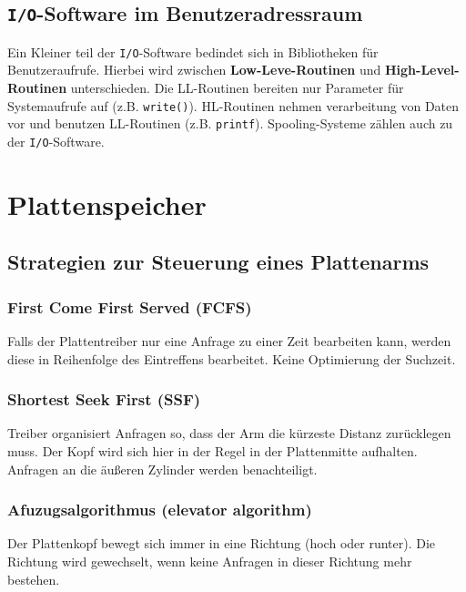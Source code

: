 \subsection{\texttt{I/O}-Software im Benutzeradressraum}

Ein Kleiner teil der \texttt{I/O}-Software bedindet sich in Bibliotheken für
Benutzeraufrufe. Hierbei wird zwischen \textbf{Low-Leve-Routinen} und
\textbf{High-Level-Routinen} unterschieden. Die LL-Routinen bereiten nur
Parameter für Systemaufrufe auf (z.B. \texttt{write()}). HL-Routinen nehmen
verarbeitung von Daten vor und benutzen LL-Routinen (z.B. \texttt{printf}).
Spooling-Systeme zählen auch zu der \texttt{I/O}-Software.

\section{Plattenspeicher}

\subsection{Strategien zur Steuerung eines Plattenarms}

\subsubsection{First Come First Served (FCFS)}

Falls der Plattentreiber nur eine Anfrage zu einer Zeit bearbeiten kann, werden
diese in Reihenfolge des Eintreffens bearbeitet. Keine Optimierung der
Suchzeit.

\subsubsection{Shortest Seek First (SSF)}

Treiber organisiert Anfragen so, dass der Arm die kürzeste Distanz zurücklegen
muss. Der Kopf wird sich hier in der Regel in der Plattenmitte aufhalten.
Anfragen an die äußeren Zylinder werden benachteiligt.

\subsubsection{Afuzugsalgorithmus (elevator algorithm)}

Der Plattenkopf bewegt sich immer in eine Richtung (hoch oder runter). Die
Richtung wird gewechselt, wenn keine Anfragen in dieser Richtung mehr bestehen.

